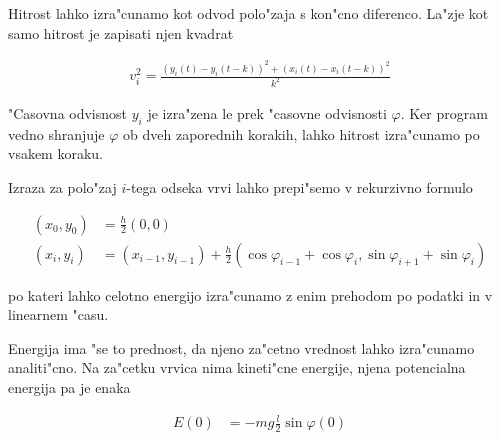 \documentclass[a4paper,10pt]{article}
\renewcommand{\phi}{\varphi}
\begin{document}
Hitrost lahko izra"cunamo kot odvod polo"zaja s kon"cno diferenco. La"zje kot samo hitrost je zapisati njen kvadrat

\begin{align}
 v_i^2 = \frac{\left(y_i(t) - y_i(t-k)\right)^2 + \left(x_i(t) - x_i(t-k)\right)^2}{k^2}
\end{align}

"Casovna odvisnost $y_i$ je izra"zena le prek "casovne odvisnosti $\phi$. Ker program vedno shranjuje $\phi$ ob dveh zaporednih korakih, lahko hitrost izra"cunamo po vsakem koraku. 

Izraza za polo"zaj $i$-tega odseka vrvi lahko prepi"semo v rekurzivno formulo

\begin{align}
 (x_0, y_0) &= \frac{h}{2}(0, 0) \\
 (x_i, y_i) &= (x_{i-1}, y_{i-1}) + \frac{h}{2} (\cos\phi_{i-1} + \cos\phi_i, \sin\phi_{i+1} + \sin\phi_i)
\end{align}

po kateri lahko celotno energijo izra"cunamo z enim prehodom po podatki in v linearnem "casu. 

Energija ima "se to prednost, da njeno za"cetno vrednost lahko izra"cunamo analiti"cno. Na za"cetku vrvica nima kineti"cne energije, njena potencialna energija pa je enaka

\begin{align}
 E(0) &= - m g \frac{l}{2} \sin \phi(0)
\end{align}

\begin{figure}
 
\end{figure}
\end{document}
